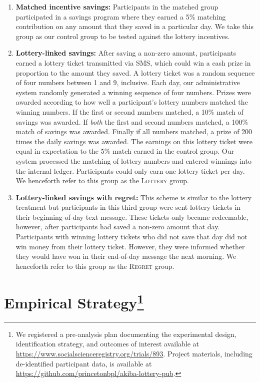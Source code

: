 \documentclass[12pt]{article}
\begin{document}
		\begin{enumerate}

			\item \textbf{Matched incentive savings:} Participants in the matched group participated in a savings program where they earned a 5\% matching contribution on any amount that they saved in a particular day. We take this group as our control group to be tested against the lottery incentives.

			\item \textbf{Lottery-linked savings:} After saving a non-zero amount, participants earned a lottery ticket transmitted via SMS, which could win a cash prize in proportion to the amount they saved. A lottery ticket was a random sequence of four numbers between 1 and 9, inclusive. Each day, our administrative system randomly generated a winning sequence of four numbers. Prizes were awarded according to how well a participant's lottery numbers matched the winning numbers. If the first or second numbers matched, a 10\% match of savings was awarded. If \emph{both} the first and second numbers matched, a 100\% match of savings was awarded. Finally if all numbers matched, a prize of 200 times the daily savings was awarded. The earnings on this lottery ticket were equal in expectation to the 5\% match earned in the control group. Our system processed the matching of lottery numbers and entered winnings into the internal ledger. Participants could only earn one lottery ticket per day. We henceforth refer to this group as the \textsc{Lottery} group.

			\item \textbf{Lottery-linked savings with regret:} This scheme is similar to the lottery treatment but participants in this third group were sent lottery tickets in their beginning-of-day text message. These tickets only became redeemable, however, after participants had saved a non-zero amount that day. Participants with winning lottery tickets who did not save that day did not win money from their lottery ticket. However, they were informed whether they would have won in their end-of-day message the next morning. We henceforth refer to this group as the \textsc{Regret} group.

		\end{enumerate}

\section{Empirical Strategy\protect\footnote{We registered a pre-analysis plan documenting the experimental design, identification strategy, and outcomes of interest available at \url{https://www.socialscienceregistry.org/trials/893}. Project materials, including de-identified participant data, is available at \url{https://github.com/princetonbpl/akiba-lottery-pub}.}} \label{sec:est}
\end{document}
